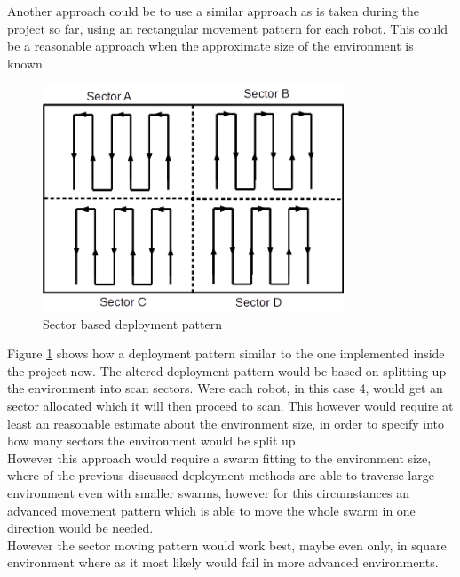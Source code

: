 Another approach could be to use a similar approach as is taken during the project so far, using an rectangular movement pattern for each robot. This could be a reasonable approach when the approximate size of the environment is known\cite{Mei2006Deployment}.

\begin{figure}[h]
\centering
\includegraphics[width = 0.8\textwidth]{../../figures/deployment_sector_pattern} 
\caption{Sector based deployment pattern}
\label{deployment_sector_pattern}
\end{figure}

Figure \ref{deployment_sector_pattern} shows how a deployment pattern similar to the one implemented inside the project now. 
The altered deployment pattern would be based on splitting up the environment into scan sectors. Were each robot, in this case 4, would get an sector allocated which it will then proceed to scan. This however would require at least an reasonable estimate about  the environment size, in order to specify into how many sectors the environment would be split up. \\[3ex]

However this approach would require a swarm fitting to the environment size, where of the previous discussed deployment methods are able to traverse large environment even with smaller swarms, however for this circumstances an advanced movement pattern which is able to move the whole swarm in one direction would be needed.\\
However the sector moving pattern would work best, maybe even only, in square environment where as it most likely would fail in more advanced environments.

